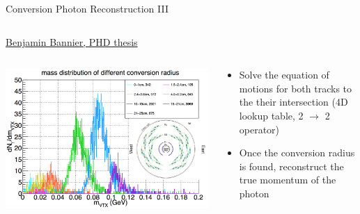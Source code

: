 \documentclass[aspectratio=169,10pt]{beamer}
\begin{document}
\begin{frame}{Conversion Photon Reconstruction III}
\begin{columns}
\begin{column}{5.5cm}
          \hspace{3cm} \tiny \href{https://www.phenix.bnl.gov/phenix/WWW/talk/archive/theses/2014/Bannier_Benjamin-thesis.pdf}{Benjamin Bannier, PHD thesis}\\
      \end{column}
   \end{columns}
   \begin{columns}
      \begin{column}{6cm}
          \vspace{-0.9cm}
         \includegraphics[width=\textwidth]{EMLectureWeek2018/InvMassConvPhenixID.png}
      \end{column}
      \begin{column}{9cm}
        \begin{itemize}
          \item Solve the equation of  motions  for both  tracks  to  the their intersection (4D lookup table, 2 $\rightarrow$ 2 operator)
          \item Once  the conversion  radius  is  found, reconstruct the true  momentum  of  the photon
        \end{itemize}
      \end{column}
    \end{columns}
  \end{frame}
\end{document}
